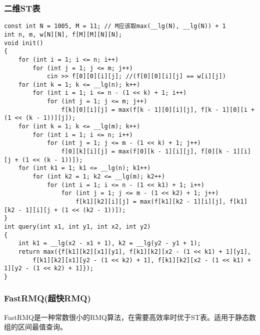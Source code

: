 \documentclass[a4paper,fontset=none]{ctexart}
\begin{document}
\subsubsection{二维ST表}
\begin{verbatim}
const int N = 1005, M = 11; // M应该取max(__lg(N), __lg(N)) + 1
int n, m, w[N][N], f[M][M][N][N];
void init()
{
    for (int i = 1; i <= n; i++)
        for (int j = 1; j <= m; j++)
            cin >> f[0][0][i][j]; //(f[0][0][i][j] == w[i][j])
    for (int k = 1; k <= __lg(n); k++)
        for (int i = 1; i <= n - (1 << k) + 1; i++)
            for (int j = 1; j <= m; j++)
                f[k][0][i][j] = max(f[k - 1][0][i][j], f[k - 1][0][i + (1 << (k - 1))][j]);
    for (int k = 1; k <= __lg(m); k++)
        for (int i = 1; i <= n; i++)
            for (int j = 1; j <= m - (1 << k) + 1; j++)
                f[0][k][i][j] = max(f[0][k - 1][i][j], f[0][k - 1][i][j + (1 << (k - 1))]);
    for (int k1 = 1; k1 <= __lg(n); k1++)
        for (int k2 = 1; k2 <= __lg(m); k2++)
            for (int i = 1; i <= n - (1 << k1) + 1; i++)
                for (int j = 1; j <= m - (1 << k2) + 1; j++)
                    f[k1][k2][i][j] = max(f[k1][k2 - 1][i][j], f[k1][k2 - 1][i][j + (1 << (k2 - 1))]);
}
int query(int x1, int y1, int x2, int y2)
{
    int k1 = __lg(x2 - x1 + 1), k2 = __lg(y2 - y1 + 1);
    return max({f[k1][k2][x1][y1], f[k1][k2][x2 - (1 << k1) + 1][y1],
        f[k1][k2][x1][y2 - (1 << k2) + 1], f[k1][k2][x2 - (1 << k1) + 1][y2 - (1 << k2) + 1]});
}
\end{verbatim}
\subsubsection{FastRMQ(超快RMQ)}

FastRMQ是一种常数很小的RMQ算法，在需要高效率时优于ST表。适用于静态数组的区间最值查询。
\end{document}

